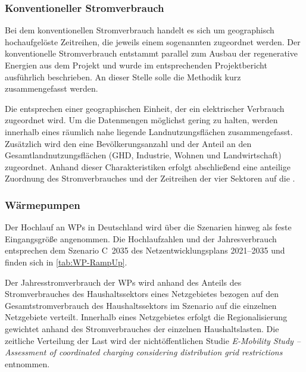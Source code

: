 \subsubsection{Konventioneller Stromverbrauch}

Bei dem konventionellen Stromverbrauch handelt es sich um geographisch hochaufgelöste Zeitreihen, die jeweils einem sogenannten \Lastgebiet zugeordnet werden.
Der konventionelle Stromverbrauch entstammt parallel zum Ausbau der regenerative Energien aus dem \openego Projekt und wurde im entsprechenden Projektbericht \cite{Mueller2019} ausführlich beschrieben.
An dieser Stelle solle die Methodik kurz zusammengefasst werden.\medskip

Die \Lastgebiete entsprechen einer geographischen Einheit, der ein elektrischer Verbrauch zugeordnet wird.
Um die Datenmengen möglichst gering zu halten, werden innerhalb eines \Lastgebietes räumlich nahe liegende Landnutzungsflächen zusammengefasst.
Zusätzlich wird den \Lastgebieten eine Bevölkerungsanzahl und der Anteil an den Gesamtlandnutzungsflächen (\gls{GHD}, Industrie, Wohnen und Landwirtschaft) zugeordnet.
Anhand dieser Charakteristiken erfolgt abschließend eine anteilige Zuordnung des Stromverbrauches und der Zeitreihen der vier Sektoren auf die \Lastgebietedot.


\subsubsection{Wärmepumpen}

Der Hochlauf an \glspl{WP} in Deutschland wird über die Szenarien hinweg als feste Eingangsgröße angenommen.
Die Hochlaufzahlen und der Jahresverbrauch entsprechen dem Szenario C~\num{2035} des Netzentwicklungsplans \numrange[range-phrase=~{--}~]{2021}{2035} \cite{BNetzA2020} und finden sich in \autoref{tab:WP-RampUp}.



Der Jahresstromverbrauch der \glspl{WP} wird anhand des Anteils des Stromverbrauches des Haushaltssektors eines Netzgebietes bezogen auf den Gesamtstromverbrauch des Haushaltssektors im Szenario \ego auf die einzelnen Netzgebiete verteilt.
Innerhalb eines Netzgebietes erfolgt die Regionalisierung gewichtet anhand des Stromverbrauches der einzelnen Haushaltslasten.
Die zeitliche Verteilung der Last wird der nichtöffentlichen Studie \textit{E-Mobility Study {--} Assessment of coordinated charging considering distribution grid restrictions} \cite{Schachler} entnommen.


